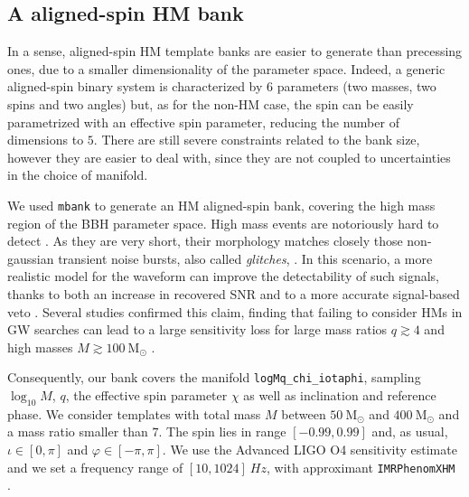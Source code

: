 \documentclass[twocolumn,showpacs,preprintnumbers,nofootinbib,prd,
superscriptaddress,10pt]{revtex4-2}
\begin{document}

\subsection{A aligned-spin HM bank} \label{sec:HM_spinning_bank}

In a sense, aligned-spin HM template banks are easier to generate than precessing ones, due to a smaller dimensionality of the parameter space. Indeed, a generic aligned-spin binary system is characterized by $6$ parameters (two masses, two spins and two angles) but, as for the non-HM case, the spin can be easily parametrized with an effective spin parameter, reducing the number of dimensions to $5$.
There are still severe constraints related to the bank size, however they are easier to deal with, since they are not coupled to uncertainties in the choice of manifold.

We used \texttt{mbank} to generate an HM aligned-spin bank, covering the high mass region of the BBH parameter space.
High mass events are notoriously hard to detect \cite{LIGOScientific:2021tfm, Chandra:2021wbw}. As they are very short, their morphology matches closely those non-gaussian transient noise bursts, also called {\it glitches}, \cite{Blackburn:2008ah, Zevin:2016qwy, LIGOScientific:2016gtq, LIGO:2021ppb}. In this scenario, a more realistic model for the waveform can improve the detectability of such signals, thanks to both an increase in recovered SNR and to a more accurate signal-based veto \cite{Babak:2005kv, PhysRevD.95.042001}.
Several studies \cite{Pekowsky:2012sr, Capano:2013raa, Varma:2014jxa, CalderonBustillo:2015lrt} confirmed this claim, finding that failing to consider HMs in GW searches can lead to a large sensitivity loss for large mass ratios $q\gtrsim 4$ and high masses $M \gtrsim \SI{100}{\mathrm{M_\odot}}$ \cite{CalderonBustillo:2016rlt}.

Consequently, our bank covers the manifold \texttt{logMq\_chi\_iotaphi}, sampling $\log_{10}M$, $q$, the effective spin parameter $\chi$ as well as inclination and reference phase.
We consider templates with total mass $M$ between $\SI{50}{\mathrm{M_\odot}}$ and $\SI{400}{\mathrm{M_\odot}}$ and a mass ratio smaller than $7$. The spin lies in range $[-0.99, 0.99]$ and, as usual, $\iota \in [0, \pi]$ and $\varphi \in [-\pi, \pi]$.
We use the Advanced LIGO O4 sensitivity estimate \cite{O4_PSDs} and we set a frequency range of $[10, 1024] \SI{}{Hz}$, with approximant \texttt{IMRPhenomXHM} \cite{Garcia-Quiros:2020qpx}.
\end{document}
